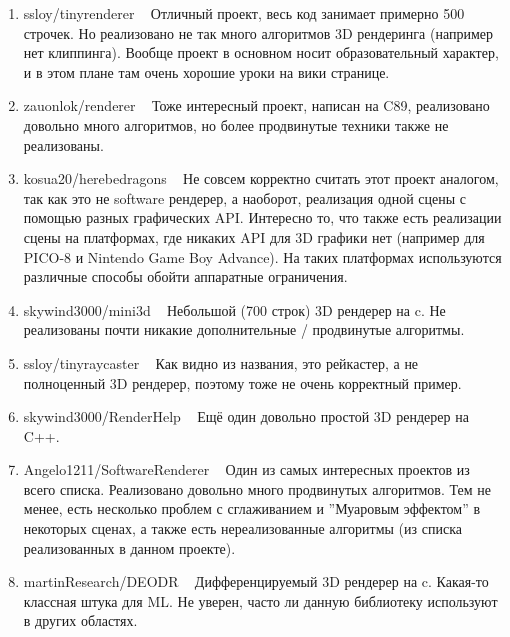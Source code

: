 \documentclass[14pt]{extarticle}
\begin{document}
\begin{enumerate}
	\item ssloy/tinyrenderer ~\cite{renderer1} Отличный проект, весь код занимает примерно 500 строчек. Но реализовано не так много алгоритмов 3D рендеринга (например нет клиппинга). Вообще проект в основном носит образовательный характер, и в этом плане там очень хорошие уроки на вики странице.
	\item zauonlok/renderer ~\cite{renderer2} Тоже интересный проект, написан на C89, реализовано довольно много алгоритмов, но более продвинутые техники также не реализованы.
	\item kosua20/herebedragons ~\cite{renderer3} Не совсем корректно считать этот проект аналогом, так как это не software рендерер, а наоборот, реализация одной сцены с помощью разных графических API. Интересно то, что также есть реализации сцены на платформах, где никаких API для 3D графики нет (например для PICO-8 и Nintendo Game Boy Advance). На таких платформах используются различные способы обойти аппаратные ограничения.
	\item skywind3000/mini3d ~\cite{renderer4} Небольшой (700 строк) 3D рендерер на c. Не реализованы почти никакие дополнительные / продвинутые алгоритмы.
	\item ssloy/tinyraycaster ~\cite{renderer5} Как видно из названия, это рейкастер, а не полноценный 3D рендерер, поэтому тоже не очень корректный пример.
	\item skywind3000/RenderHelp ~\cite{renderer6} Ещё один довольно простой 3D рендерер на C++.
	\item Angelo1211/SoftwareRenderer ~\cite{renderer7} Один из самых интересных проектов из всего списка. Реализовано довольно много продвинутых алгоритмов. Тем не менее, есть несколько проблем с сглаживанием и ''Муаровым эффектом'' в некоторых сценах, а также есть нереализованные алгоритмы (из списка реализованных в данном проекте).
	\item martinResearch/DEODR ~\cite{renderer8} Дифференцируемый 3D рендерер на c. Какая-то классная штука для ML. Не уверен, часто ли данную библиотеку используют в других областях.
\end{enumerate}
\end{document}
